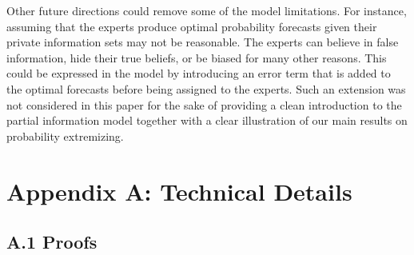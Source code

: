 \documentclass[11pt]{article}
\theoremstyle{definition}
\theoremstyle{definition}
\begin{document}
 
 Other future directions could  remove some of the model limitations. For instance, assuming that the experts produce optimal probability forecasts given their private information sets may not be reasonable. The experts can believe in false information, hide their true beliefs, or be biased for many other reasons. This could be expressed in the model by introducing an error term that is added to the optimal forecasts before being assigned to the experts. Such an extension was not considered in this paper for the sake of providing a clean introduction to the partial information model together with a clear illustration of our main results on  probability extremizing. 
 
  \appendix 
\section*{Appendix A: Technical Details}
\label{appendix}

\subsection*{A.1  Proofs}
\end{document}
